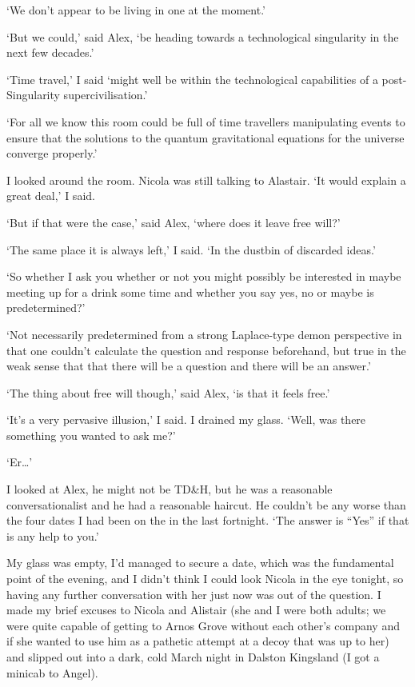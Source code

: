`We don't appear to be living in one at the moment.'

`But we could,' said Alex, `be heading towards a technological singularity in the next few decades.'

`Time travel,' I said `might well be within the technological capabilities of a post-Singularity supercivilisation.'

`For all we know this room could be full of time travellers manipulating events to ensure that the solutions to the quantum gravitational equations for the universe converge properly.'

I looked around the room. Nicola was still talking to Alastair. `It would explain a great deal,' I said.

`But if that were the case,' said Alex, `where does it leave free will?'

`The same place it is always left,' I said. `In the dustbin of discarded ideas.'

`So whether I ask you whether or not you might possibly be interested in maybe meeting up for a drink some time and whether you say yes, no or maybe is predetermined?'

`Not necessarily predetermined from a strong Laplace-type demon perspective in that one couldn't calculate the question and response beforehand, but true in the weak sense that that there will be a question and there will be an answer.'

`The thing about free will though,' said Alex, `is that it feels free.'

`It's a very pervasive illusion,' I said. I drained my glass. `Well, was there something you wanted to ask me?'

`Er\dots'

I looked at Alex, he might not be TD{\&}H, but he was a reasonable conversationalist and he had a reasonable haircut. He couldn't be any worse than the four dates I had been on the in the last fortnight. `The answer is ``Yes'' if that is any help to you.'

My glass was empty, I'd managed to secure a date, which was the fundamental point of the evening, and I didn't think I could look Nicola in the eye tonight, so having any further conversation with her just now was out of the question. I made my brief excuses to Nicola and Alistair (she and I were both adults; we were quite capable of getting to Arnos Grove without each other's company and if she wanted to use him as a pathetic attempt at a decoy that was up to her) and slipped out into a dark, cold March night in Dalston Kingsland (I got a minicab to Angel).


